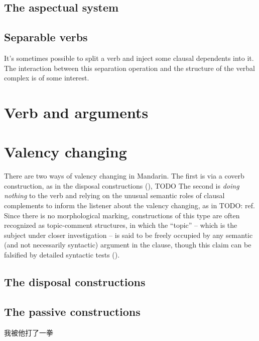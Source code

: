 \documentclass[UTF8, a4paper, oneside, scheme=plain]{ctexrep}
\begin{document}
\section{The aspectual system}\label{sec:aspectual}

\section{Separable verbs}\label{sec:separable-verbs}

It's sometimes possible to split a verb and inject some clausal dependents into it.
The interaction between this separation operation and the structure of the verbal complex is of some interest.

\chapter{Verb and arguments}

\chapter{Valency changing}

There are two ways of valency changing in Mandarin.
The first is via a coverb construction, 
as in the disposal constructions (),
TODO 
The second is \emph{doing nothing} to the verb 
and relying on the unusual semantic roles of clausal complements 
to inform the listener about the valency changing,
as in TODO: ref.
Since there is no morphological marking,
constructions of this type are often recognized as topic-comment structures,
in which the ``topic'' -- which is the subject under closer investigation -- 
is said to be freely occupied by any semantic (and not necessarily syntactic) argument in the clause,
though this claim can be falsified by detailed syntactic tests ().

\section{The disposal constructions}\label{sec:disposal-construction}

\section{The passive constructions}\label{sec:affected-construction}

\begin{exe}
    \ex 我被他打了一拳
\end{exe}
\end{document}
